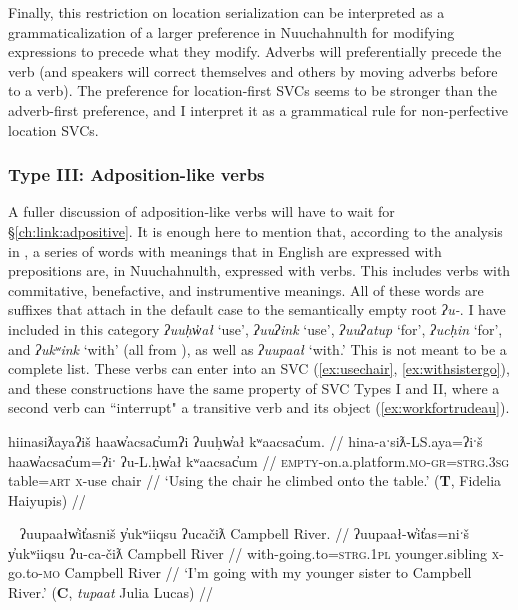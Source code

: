Finally, this restriction on location serialization can be interpreted as a grammaticalization of a larger preference in Nuuchahnulth for modifying expressions to precede what they modify. Adverbs will preferentially precede the verb (and speakers will correct themselves and others by moving adverbs before to a verb). The preference for location-first SVCs seems to be stronger than the adverb-first preference, and I interpret it as a grammatical rule for non-perfective location SVCs.

\vspace{10pt}

\subsubsection{Type III: Adposition-like verbs} \label{ch:sv:data:type3}

\vspace{10pt}

A fuller discussion of adposition-like verbs will have to wait for \S\ref{ch:link:adpositive}. It is enough here to mention that, according to the analysis in \citet{woo2007b}, a series of words with meanings that in English are expressed with prepositions are, in Nuuchahnulth, expressed with verbs. This includes verbs with commitative, benefactive, and instrumentive meanings. All of these words are suffixes that attach in the default case to the semantically empty root \textit{ʔu-}. I have included in this category \textit{ʔuuḥw̓ał} `use', \textit{ʔuuʔink} `use', \textit{ʔuuʔatup} `for', \textit{ʔucḥin} `for', and \textit{ʔukʷink} `with' (all from \citet[p.~15]{woo2007b}), as well as \textit{ʔuupaał} `with.' This is not meant to be a complete list. These verbs can enter into an SVC  (\ref{ex:usechair}, \ref{ex:withsistergo}), and these constructions have the same property of SVC Types I and II, where a second verb can ``interrupt" a transitive verb and its object (\ref{ex:workfortrudeau}).

\ex \label{ex:usechair}
\begingl
\glpreamble hiinasiƛayaʔiš haaw̓acsac̓umʔi ʔuuḥw̓ał kʷaacsac̓um. //
\gla hina-aˑsiƛ-LS.aya=ʔiˑš haaw̓acsac̓um=ʔiˑ ʔu-L.ḥw̓ał kʷaacsac̓um //
\glb \textsc{empty}-on.a.platform.\textsc{mo}-\textsc{gr}=\textsc{strg.3sg} table=\textsc{art} \textsc{x}-use chair //
\glft `Using the chair he climbed onto the table.' (\textbf{T}, Fidelia Haiyupis) //
\endgl
\xe

\ex~ \label{ex:withsistergo}
\begingl
\glpreamble ʔuupaałw̓it̓asniš y̓ukʷiiqsu ʔucačiƛ Campbell River. //
\gla ʔuupaał-w̓it̓as=niˑš y̓ukʷiiqsu ʔu-ca-čiƛ Campbell River //
\glb with-going.to=\textsc{strg.1pl} younger.sibling \textsc{x}-go.to-\textsc{mo} Campbell River //
\glft `I'm going with my younger sister to Campbell River.' (\textbf{C}, \textit{tupaat} Julia Lucas) //
\endgl
\xe


